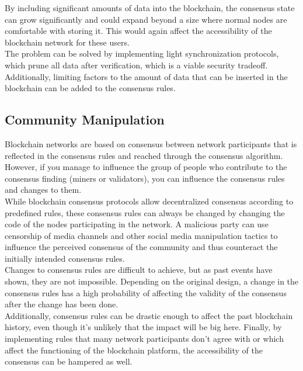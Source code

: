 \documentclass[11pt,a4paper]{article}
\begin{document}
By including significant amounts of data into the blockchain, the consensus state can grow significantly and could expand beyond a size where normal nodes are comfortable with storing it. This would again affect the accessibility of the blockchain network for these users.\\

The problem can be solved by implementing light synchronization protocols, which prune all data after verification, which is a viable security tradeoff. Additionally, limiting factors to the amount of data that can be inserted in the blockchain can be added to the consensus rules.\\

\subsection{Community Manipulation}

Blockchain networks are based on consensus between network participants that is reflected in the consensus rules and reached through the consensus algorithm. However, if you manage to influence the group of people who contribute to the consensus finding (miners or validators), you can influence the consensus rules and changes to them.\\

While blockchain consensus protocols allow decentralized consensus according to predefined rules, these consensus rules can always be changed by changing the code of the nodes participating in the network. A malicious party can use censorship of media channels and other social media manipulation tactics to influence the perceived consensus of the community and thus counteract the initially intended consensus rules.\\

Changes to consensus rules are difficult to achieve, but as past events have shown, they are not impossible. Depending on the original design, a change in the consensus rules has a high probability of affecting the validity of the consensus after the change has been done.\\

Additionally, consensus rules can be drastic enough to affect the past blockchain history, even though it's unlikely that the impact will be big here. Finally, by implementing rules that many network participants don't agree with or which affect the functioning of the blockchain platform, the accessibility of the consensus can be hampered as well.\\
\end{document}
